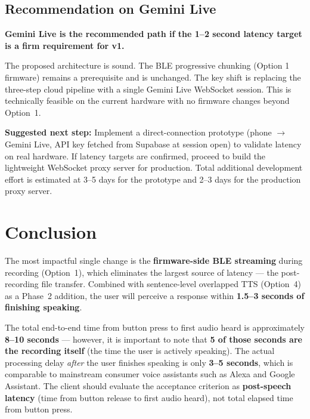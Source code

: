 \documentclass[12pt,a4paper]{article}
\begin{document}
\subsection{Recommendation on Gemini Live}

\begin{mdframed}[backgroundcolor=hwbg, linecolor=primary, linewidth=1.5pt, roundcorner=4pt,
  innerleftmargin=12pt, innerrightmargin=12pt, innertopmargin=10pt, innerbottommargin=10pt]
\textbf{Gemini Live is the recommended path if the 1--2 second latency target is a firm
requirement for v1.}

\medskip
The proposed architecture is sound. The BLE progressive chunking (Option 1 firmware) remains
a prerequisite and is unchanged. The key shift is replacing the three-step cloud pipeline with
a single Gemini Live WebSocket session. This is technically feasible on the current hardware
with no firmware changes beyond Option~1.

\medskip
\textbf{Suggested next step:} Implement a direct-connection prototype (phone $\rightarrow$
Gemini Live, API key fetched from Supabase at session open) to validate latency on real
hardware. If latency targets are confirmed, proceed to build the lightweight WebSocket proxy
server for production. Total additional development effort is estimated at 3--5 days for the
prototype and 2--3 days for the production proxy server.
\end{mdframed}

\section*{Conclusion}

The most impactful single change is the \textbf{firmware-side BLE streaming} during recording
(Option~1), which eliminates the largest source of latency — the post-recording file transfer.
Combined with sentence-level overlapped TTS (Option~4) as a Phase~2 addition, the user will
perceive a response within \textbf{1.5--3 seconds of finishing speaking}.

The total end-to-end time from button press to first audio heard is approximately
\textbf{8--10 seconds} — however, it is important to note that \textbf{5 of those seconds are
the recording itself} (the time the user is actively speaking). The actual processing delay
\emph{after} the user finishes speaking is only \textbf{3--5 seconds}, which is comparable to
mainstream consumer voice assistants such as Alexa and Google Assistant. The client should
evaluate the acceptance criterion as \textbf{post-speech latency} (time from button release to
first audio heard), not total elapsed time from button press.
\end{document}
